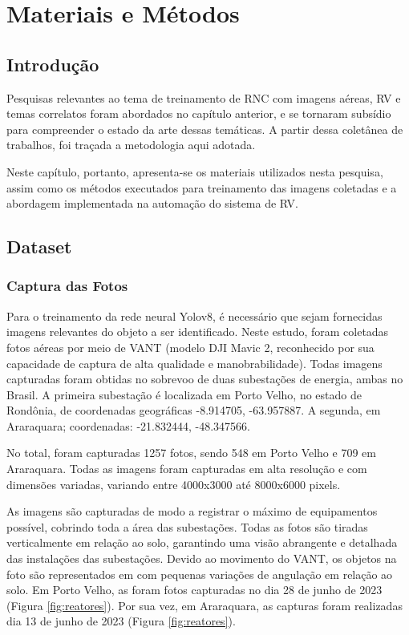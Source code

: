 \chapter{Materiais e Métodos}

\section{Introdução}

Pesquisas relevantes ao tema de treinamento de RNC com imagens aéreas, RV e temas correlatos foram abordados no capítulo anterior, e se tornaram subsídio para compreender o estado da arte dessas temáticas. A partir dessa coletânea de trabalhos, foi traçada a metodologia aqui adotada.

Neste capítulo, portanto, apresenta-se os materiais utilizados nesta pesquisa, assim como os métodos executados para treinamento das imagens coletadas e a abordagem implementada na automação do sistema de RV.

\section{Dataset}

\subsection{Captura das Fotos}

Para o treinamento da rede neural Yolov8, é necessário que sejam fornecidas imagens relevantes do objeto a ser identificado. Neste estudo, foram coletadas fotos aéreas por meio de VANT (modelo DJI Mavic 2, reconhecido por sua capacidade de captura de alta qualidade e manobrabilidade). Todas imagens capturadas foram obtidas no sobrevoo de duas subestações de energia, ambas no Brasil. A primeira subestação é localizada em Porto Velho, no estado de Rondônia, de coordenadas geográficas -8.914705, -63.957887. A segunda, em Araraquara; coordenadas: -21.832444, -48.347566. 

No total, foram capturadas 1257 fotos, sendo  548 em Porto Velho e 709 em Araraquara. Todas as imagens foram capturadas em alta resolução e com dimensões variadas, variando entre 4000x3000 até 8000x6000 pixels. 

As imagens são capturadas de modo a registrar o máximo de equipamentos possível, cobrindo toda a área das subestações. Todas as fotos são tiradas verticalmente em relação ao solo, garantindo uma visão abrangente e detalhada das instalações das subestações. Devido ao movimento do VANT, os objetos na foto são representados em com pequenas variações de angulação em relação ao solo. Em Porto Velho, as foram fotos capturadas no dia 28 de junho de 2023 (Figura \ref{fig:reatores}). Por sua vez, em Araraquara, as capturas foram realizadas dia 13 de junho de 2023 (Figura  \ref{fig:reatores}).

